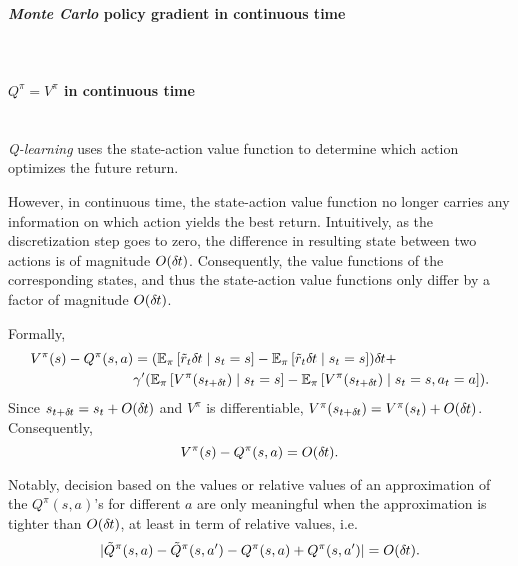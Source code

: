 \paragraph{\emph{Monte Carlo} policy gradient in continuous time}~\\

\paragraph{$Q^\pi = V^\pi$ in continuous time}~\\
\label{sec:QContinuous}
\emph{Q-learning} uses the state-action value function to determine which
action optimizes the future return.

However, in continuous time, the state-action value function no longer carries
any information on which action yields the best return. Intuitively, as the
discretization step goes to zero, the difference in resulting state between two
actions is of magnitude $O (\delta\hspace{-.06em}t)$. Consequently, the value functions of
the corresponding states, and thus the state-action value functions only differ
by a factor of magnitude $O (\delta\hspace{-.06em}t)$.

Formally,
\begin{align}
	V^\pi(s) - Q^\pi(s, a) &= 
	(\mathbb{E}_\pi\left[\tilde{r}_t \delta\hspace{-.06em}t \mid s_t=s\right] -
	\mathbb{E}_\pi\left[\tilde{r}_t \delta\hspace{-.06em}t \mid s_t=s\right]) \delta\hspace{-.06em}t +\\
	&\gamma'(\mathbb{E}_\pi\left[
		V^\pi(s_{t + \delta\hspace{-.06em}t})
		\mid s_t = s
	\right] - \mathbb{E}_\pi\left[
		V^\pi(s_{t + \delta\hspace{-.06em}t})
		\mid s_t = s, a_t=a
	\right]).\nonumber
\end{align}
Since $s_{t+\delta\hspace{-.06em}t} = s_t + O (\delta\hspace{-.06em}t)$ and $V^\pi$ is differentiable,
$V^\pi(s_{t+\delta\hspace{-.06em}t}) = V^\pi(s_t) + O (\delta\hspace{-.06em}t)$. Consequently,
\begin{equation}
	V^\pi(s) - Q^\pi(s, a) = O (\delta\hspace{-.06em}t).
\end{equation}

Notably, decision based on the values or relative values of an approximation of
the $Q^\pi(s, a)$'s for different $a$ are only meaningful when the
approximation is tighter than $O (\delta\hspace{-.06em}t)$, at least in term of relative
values, i.e.  
\begin{equation*}
	|\tilde{Q}^\pi(s, a) - \tilde{Q}^\pi(s, a') - Q^\pi(s, a) +
	Q^\pi(s, a')| = O (\delta\hspace{-.06em}t).
\end{equation*}

